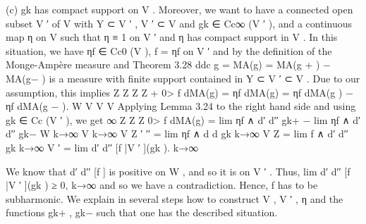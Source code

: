 \documentclass[
  10pt,
]{article}
\newenvironment{Shaded}{}{}
\newcommand{\NormalTok}[1]{#1}
\begin{document}
\begin{Shaded}
\begin{Highlighting}[]
\NormalTok{    (c) gk has compact support on V .}
\NormalTok{Moreover, we want to have a connected open subset V ′ of V with Y ⊂ V ′ , V ′ ⊂ V and}
\NormalTok{gk ∈ Cc∞ (V ′ ), and a continuous map η on V such that η ≡ 1 on V ′ and η has compact}
\NormalTok{support in V .}
\NormalTok{   In this situation, we have ηf ∈ Cc0 (V ), f = ηf on V ′ and by the definition of the}
\NormalTok{Monge{-}Ampère measure and Theorem 3.28}
\NormalTok{                            ddc g = MA(g) = MA(g + ) − MA(g− )}
\NormalTok{is a measure with finite support contained in Y ⊂ V ′ ⊂ V . Due to our assumption, this}
\NormalTok{implies}
\NormalTok{          Z                 Z                 Z                 Z}
\NormalTok{                                                           +}
\NormalTok{       0\textgreater{}     f dMA(g) =       ηf dMA(g) =      ηf dMA(g ) −       ηf dMA(g − ).}
\NormalTok{             W                   V                        V   V}
\NormalTok{Applying Lemma 3.24 to the right hand side and using gk ∈ Cc (V ′ ), we get}
\NormalTok{                                                           ∞}
\NormalTok{                   Z                            Z                           Z}
\NormalTok{             0\textgreater{}         f dMA(g) = lim              ηf ∧ d′ d′′ gk+ − lim       ηf ∧ d′ d′′ gk−}
\NormalTok{                    W                   k→∞ V                        k→∞    V}
\NormalTok{                                                Z}
\NormalTok{                                                           ′ ′′}
\NormalTok{                                     = lim          ηf ∧ d d gk}
\NormalTok{                                        k→∞ V}
\NormalTok{                                                Z}
\NormalTok{                                     = lim       f ∧ d′ d′′ gk}
\NormalTok{                                      k→∞ V ′}
\NormalTok{                                     = lim d′ d′′ [f |V ′ ](gk ).}
\NormalTok{                                      k→∞}

\NormalTok{We know that d′ d′′ [f ] is positive on W , and so it is on V ′ . Thus,}
\NormalTok{                                        lim d′ d′′ [f |V ′ ](gk ) ≥ 0,}
\NormalTok{                                       k→∞}
\NormalTok{and so we have a contradiction. Hence, f has to be subharmonic.}
\NormalTok{  We explain in several steps how to construct V , V ′ , η and the functions gk+ , gk− such}
\NormalTok{that one has the described situation.}


\end{Highlighting}
\end{Shaded}
\end{document}
